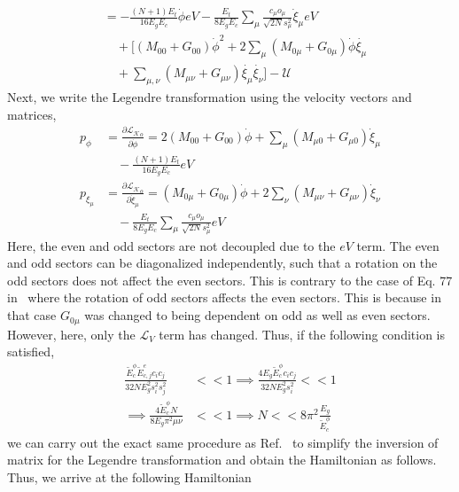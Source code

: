 \documentclass[%
reprint,
superscriptaddress,
 amsmath,amssymb,
 aps,
 prx,
longbibliography,
floatfix,
]{revtex4-2}
\begin{document}
\begin{align}
    &=-\frac{(N+1)E_t}{16E_gE_c}\dot{\phi}eV-\frac{E_t}{8E_gE_c} \sum_\mu\frac{c_\mu o_\mu}{\sqrt{2N}s_\mu^2}  \dot{\xi}_\mu eV\nonumber\\
    &\quad+\Big[(M_{00}+G_{00})\dot{\phi}^2+2\sum_{\mu}(M_{0\mu}+G_{0\mu})\dot{\phi}\dot{\xi_\mu}\nonumber\\&\quad+\sum_{\mu,\nu}(M_{\mu\nu}+G_{\mu\nu})\dot{\xi_\mu}\dot{\xi_\nu}\Big]-\mathcal{U}
\end{align}
Next, we write the Legendre transformation using the velocity vectors and matrices,
\begin{align}
     p_{\phi}&=\frac{\partial \mathcal{L_K}_o}{\partial \dot{\phi}}=2(M_{00}+G_{00}) \dot{\phi}+\sum_{\mu}(M_{\mu 0}+G_{\mu 0})\dot{\xi}_{\mu}\nonumber\\
    &\quad-\frac{(N+1)E_t}{16E_gE_c}eV\\
    p_{\xi_\mu}&=\frac{\partial \mathcal{L_K}_o}{\partial \dot{\xi}_\mu}=(M_{0\mu}+G_{0\mu}) \dot{\phi}+2\sum_{\nu} (M_{\mu\nu}+G_{\mu\nu}) \dot{\xi}_\nu\nonumber\\
    &\quad-\frac{E_t}{8E_gE_c} \sum_\mu\frac{c_\mu o_\mu}{\sqrt{2N}s_\mu^2}eV
    \end{align}
Here, the even and odd sectors are not decoupled due to the $eV$ term. The even and odd sectors can be diagonalized independently, such that a rotation on the odd sectors does not affect the even sectors. This is contrary to the case of Eq. 77 in~\cite{viola2015collective} where the rotation of odd sectors affects the even sectors. This is because in that case $G_{0\mu}$ was changed to being dependent on odd as well as even sectors. However, here, only the $\mathcal{L}_V$ term has changed. Thus, if the following condition is satisfied, 
\begin{align}
     \frac{\tilde{E}_{c}^{\phi}\tilde{E}_{c,j}^{e}c_i c_j}{32NE_g^2s_i^2 s_j^2}&<<1\implies \frac{4E_g\tilde{E}_{c}^{\phi}c_i c_j}{32NE_g^2s_i^2 }<<1\\
     \implies \frac{4\tilde{E}_{c}^{\phi}N}{8E_g \pi^2\mu\nu }&<<1\implies N<<8\pi^2\frac{E_g}{\tilde{E}_{c}^{\phi}}
 \end{align}
we can carry out the exact same procedure as Ref.~\cite{viola2015collective} to simplify the inversion of matrix for the Legendre transformation and obtain the Hamiltonian as follows. Thus, we arrive at the following Hamiltonian
\end{document}
